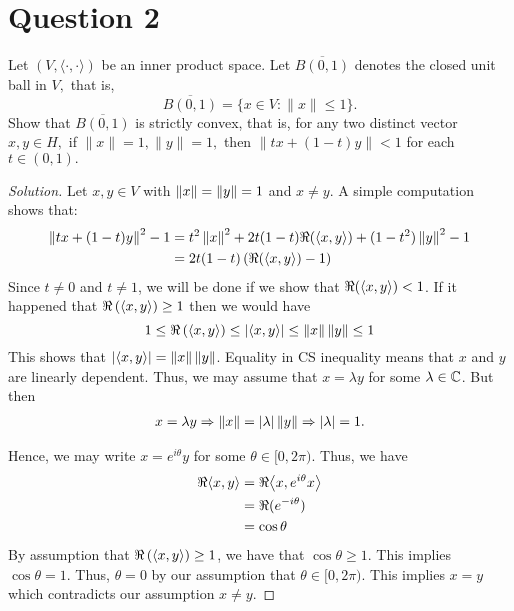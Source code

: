 \section{Question 2}

\horz

Let $(V,\langle \cdot, \cdot \rangle)$ be an inner product space. Let $\overline{B(0,1)}$ denotes the closed unit ball in $V,$ that is, $$\overline{B(0,1)} = \{x\in V : \|x\|\leqslant 1\}.$$
Show that $\overline{B(0,1)}$ is strictly convex, that is, for any two distinct vector $x,y\in H,$ if $\|x\|=1, \|y\|=1,$ then $\|tx+(1-t)y\| < 1$ for each $t\in (0,1).$
 
\horz

\begin{proof}[Solution]
    Let $x,y \in V$ with $\left\lVert x \right\rVert=\left\lVert y \right\rVert=1$ and $x\ne y$. A simple computation shows that: 
    \begin{align*}
	\left\lVert tx+(1-t)y \right\rVert^{2} -1 &= t^{2} \left\lVert x \right\rVert^{2} + 2t(1-t)\Re(\left\langle x,y \right\rangle) + (1-t^{2}) \left\lVert y \right\rVert^{2}  -1 \\
	    &= 2t(1-t) \left( \Re (\left\langle x,y \right\rangle) -1 \right)
	\end{align*}
	Since $t\ne 0$ and $t\ne 1$, we will be done if we show that $\Re (\left\langle x,y \right\rangle) < 1$. If it happened that $\Re \left( \left\langle x,y \right\rangle \right) \ge 1$ then we would have
	\begin{equation*}
	    1 \le \Re  \left( \left\langle x,y \right\rangle \right) \le \left\lvert \left\langle x,y \right\rangle \right\rvert \le \left\lVert x \right\rVert \left\lVert y \right\rVert \le 1
	\end{equation*}
	This shows that $\left\lvert \left\langle x,y \right\rangle \right\rvert = \left\lVert x \right\rVert\left\lVert y \right\rVert$. Equality in CS inequality means that $x$ and $y$ are linearly dependent. Thus, we may assume that $x=\lambda y$ for some $\lambda \in \mathbb C$. But then
	\begin{align*}
	    x= \lambda y \Rightarrow \left\lVert x \right\rVert = \left\lvert \lambda \right\rvert\left\lVert y \right\rVert \Rightarrow \left\lvert \lambda \right\rvert=1\text{.}
	\end{align*}

	Hence, we may write $x=e^{i\theta} y$ for some $\theta \in [0,2\pi)$. Thus, we have
	\begin{align*}
	    \Re{\left\langle x,y \right\rangle} &= \Re {\left\langle x, e^{i\theta} x \right\rangle} \\
	    &= \Re{(e^{-i\theta})} \\
	    &= \cos \theta 
	\end{align*}
	By assumption that $\Re \left( \left\langle x,y \right\rangle \right) \ge 1$, we have that $\cos \theta \ge 1$. This implies $\cos \theta = 1$. Thus, $\theta = 0$ by our assumption that $\theta \in [0, 2\pi)$. This implies $x=y$ which contradicts our assumption $x\ne y$.
\end{proof}
